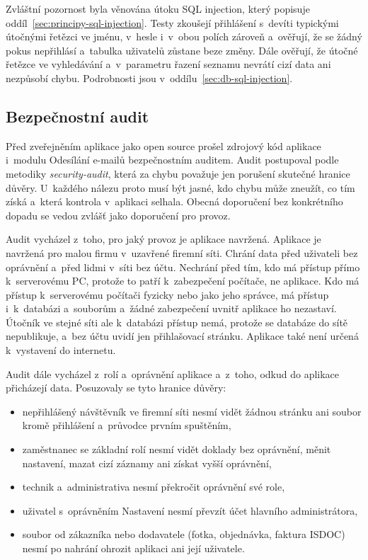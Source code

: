 Zvláštní pozornost byla věnována útoku SQL injection, který popisuje oddíl~\ref{sec:principy-sql-injection}. Testy zkoušejí přihlášení s~devíti typickými útočnými řetězci ve jménu, v~hesle i~v~obou polích zároveň a~ověřují, že se žádný pokus nepřihlásí a~tabulka uživatelů zůstane beze změny. Dále ověřují, že útočné řetězce ve vyhledávání a~v~parametru řazení seznamu nevrátí cizí data ani nezpůsobí chybu. Podrobnosti jsou v~oddílu~\ref{sec:db-sql-injection}.

\subsection{Bezpečnostní audit}\label{sec:bezpecnostni-audit}

Před zveřejněním aplikace jako open source prošel zdrojový kód aplikace i~modulu Odesílání e-mailů bezpečnostním auditem. Audit postupoval podle metodiky \emph{security-audit}, která za chybu považuje jen porušení skutečné hranice důvěry. U~každého nálezu proto musí být jasné, kdo chybu může zneužít, co tím získá a~která kontrola v~aplikaci selhala. Obecná doporučení bez konkrétního dopadu se vedou zvlášť jako doporučení pro provoz.

Audit vycházel z~toho, pro jaký provoz je aplikace navržená. Aplikace je navržená pro malou firmu v~uzavřené firemní síti. Chrání data před uživateli bez oprávnění a~před lidmi v~síti bez účtu. Nechrání před tím, kdo má přístup přímo k~serverovému PC, protože to patří k~zabezpečení počítače, ne aplikace. Kdo má přístup k~serverovému počítači fyzicky nebo jako jeho správce, má přístup i~k~databázi a~souborům a~žádné zabezpečení uvnitř aplikace ho nezastaví. Útočník ve stejné síti ale k~databázi přístup nemá, protože se databáze do sítě nepublikuje, a~bez účtu uvidí jen přihlašovací stránku. Aplikace také není určená k~vystavení do internetu.

Audit dále vycházel z~rolí a~oprávnění aplikace a~z~toho, odkud do aplikace přicházejí data. Posuzovaly se tyto hranice důvěry:
\begin{itemize}
	\item nepřihlášený návštěvník ve firemní síti nesmí vidět žádnou stránku ani soubor kromě přihlášení a~průvodce prvním spuštěním,
	\item zaměstnanec se základní rolí nesmí vidět doklady bez oprávnění, měnit nastavení, mazat cizí záznamy ani získat vyšší oprávnění,
	\item technik a~administrativa nesmí překročit oprávnění své role,
	\item uživatel s~oprávněním Nastavení nesmí převzít účet hlavního administrátora,
	\item soubor od zákazníka nebo dodavatele (fotka, objednávka, faktura ISDOC) nesmí po nahrání ohrozit aplikaci ani její uživatele.
\end{itemize}

